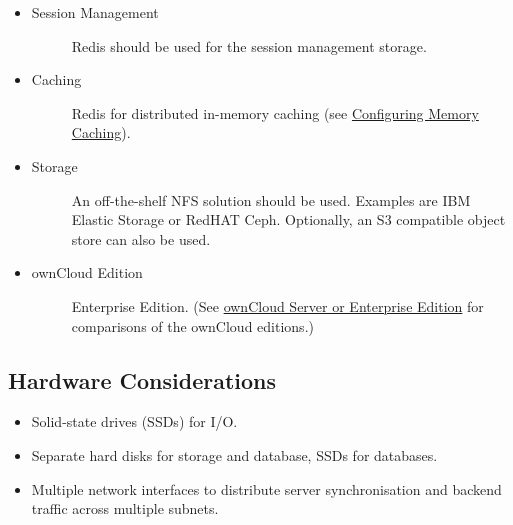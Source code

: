 \documentclass[letterpaper,10pt,english]{sphinxmanual}
\begin{document}
\begin{itemize}
\item {} \begin{description}
\item[{Session Management}] \leavevmode
Redis should be used for the session management storage.

\end{description}

\item {} \begin{description}
\item[{Caching}] \leavevmode
Redis for distributed in-memory caching (see \href{https://doc.owncloud.org/server/9.0/admin\_manual/configuration\_server/caching\_configuration.html}{Configuring Memory
Caching}).

\end{description}

\item {} \begin{description}
\item[{Storage}] \leavevmode
An off-the-shelf NFS solution should be used. Examples are IBM Elastic
Storage or RedHAT Ceph. Optionally, an S3 compatible object store can also
be used.

\end{description}

\item {} \begin{description}
\item[{ownCloud Edition}] \leavevmode
Enterprise Edition. (See \href{https://owncloud.com/owncloud-server-or-enterprise-edition/}{ownCloud Server or Enterprise Edition} for
comparisons of the ownCloud editions.)

\end{description}

\end{itemize}


\subsection{Hardware Considerations}
\label{installation/deployment_recommendations:hardware-considerations}\begin{itemize}
\item {} 
Solid-state drives (SSDs) for I/O.

\item {} 
Separate hard disks for storage and database, SSDs for databases.

\item {} 
Multiple network interfaces to distribute server synchronisation and backend
traffic across multiple subnets.

\end{itemize}
\end{document}
